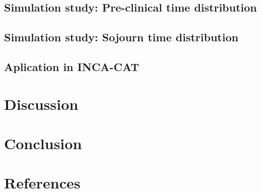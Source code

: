 \documentclass[10pt,a4paper]{article}
\begin{document}
\subsection{Simulation study: Pre-clinical time distribution}

\subsection{Simulation study: Sojourn time distribution}

\subsection{Aplication in INCA-CAT}

\section{Discussion}

\section{Conclusion}

\section{References}
\end{document}
